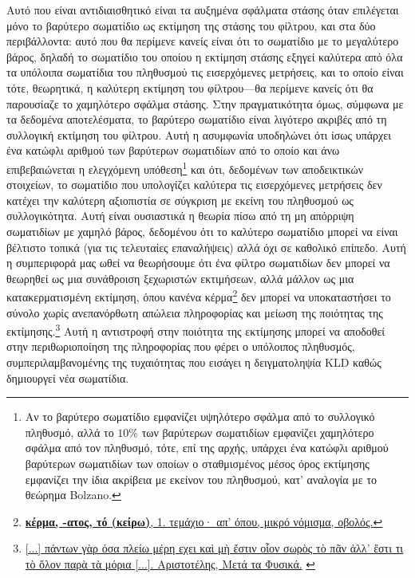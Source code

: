 Αυτό που είναι αντιδιαισθητικό είναι τα αυξημένα σφάλματα στάσης όταν
επιλέγεται μόνο το βαρύτερο σωματίδιο ως εκτίμηση της στάσης του φίλτρου, και
στα δύο περιβάλλοντα: αυτό που θα περίμενε κανείς είναι ότι το σωματίδιο με το
μεγαλύτερο βάρος, δηλαδή το σωματίδιο του οποίου η εκτίμηση στάσης εξηγεί
καλύτερα από όλα τα υπόλοιπα σωματίδια του πληθυσμού τις εισερχόμενες
μετρήσεις, και το οποίο είναι τότε, θεωρητικά, η καλύτερη εκτίμηση του
φίλτρου---θα περίμενε κανείς ότι θα παρουσίαζε το χαμηλότερο σφάλμα στάσης.
Στην πραγματικότητα όμως, σύμφωνα με τα δεδομένα αποτελέσματα, το βαρύτερο
σωματίδιο είναι λιγότερο ακριβές από τη συλλογική εκτίμηση του φίλτρου. Αυτή η
ασυμφωνία υποδηλώνει ότι ίσως υπάρχει ένα κατώφλι αριθμού των βαρύτερων
σωματιδίων από το οποίο και άνω επιβεβαιώνεται η ελεγχόμενη υπόθεση\footnote{Αν
το βαρύτερο σωματίδιο εμφανίζει υψηλότερο σφάλμα από το συλλογικό πληθυσμό,
αλλά το $10\%$ των βαρύτερων σωματιδίων εμφανίζει χαμηλότερο σφάλμα από τον
πληθυσμό, τότε, επί της αρχής, υπάρχει ένα κατώφλι αριθμού βαρύτερων σωματιδίων
των οποίων ο σταθμισμένος μέσος όρος εκτίμησης εμφανίζει την ίδια ακρίβεια με
εκείνον του πληθυσμού, κατ' αναλογία με το θεώρημα Bolzano.} και ότι, δεδομένων
των αποδεικτικών στοιχείων, το σωματίδιο που υπολογίζει καλύτερα τις
εισερχόμενες μετρήσεις δεν κατέχει την καλύτερη αξιοπιστία σε σύγκριση με
εκείνη του πληθυσμού ως συλλογικότητα. Αυτή είναι ουσιαστικά η θεωρία πίσω από
τη μη απόρριψη σωματιδίων με χαμηλό βάρος, δεδομένου ότι το καλύτερο σωματίδιο
μπορεί να είναι βέλτιστο τοπικά (για τις τελευταίες επαναλήψεις) αλλά όχι σε
καθολικό επίπεδο. Αυτή η συμπεριφορά μας ωθεί να θεωρήσουμε ότι ένα φίλτρο
σωματιδίων δεν μπορεί να θεωρηθεί ως μια συνάθροιση ξεχωριστών εκτιμήσεων, αλλά
μάλλον ως μια κατακερματισμένη εκτίμηση, όπου κανένα
κέρμα\footnote{\href{https://www.greek-language.gr/digitalResources/ancient_greek/tools/liddell-scott/search.html?lq=\%CE\%BA\%CE\%AD\%CF\%81\%CE\%BC\%CE\%B1}
{\textbf{κέρμα, -ατος, τό (κείρω)}, 1.  τεμάχιο· απ' όπου, μικρό νόμισμα,
οβολός.}} δεν μπορεί να υποκαταστήσει το σύνολο χωρίς ανεπανόρθωτη απώλεια
πληροφορίας και μείωση της ποιότητας της
εκτίμησης.\footnote{\href{https://bit.ly/3Hw9T12}{[...] πάντων γὰρ όσα πλείω
μέρη εχει καὶ μὴ ἔστιν οἷον σωρὸς τὸ πᾶν ἀλλ' ἔστι τι τὸ ὅλον παρὰ τὰ μόρια
[...]. Αριστοτέλης, Μετά τα Φυσικά.} \label{quote:aristotle}} Αυτή η αντιστροφή
στην ποιότητα της εκτίμησης μπορεί να αποδοθεί στην περιθωριοποίηση της
πληροφορίας που φέρει ο υπόλοιπος πληθυσμός, συμπεριλαμβανομένης της
τυχαιότητας που εισάγει η δειγματοληψία KLD καθώς δημιουργεί νέα σωματίδια.

